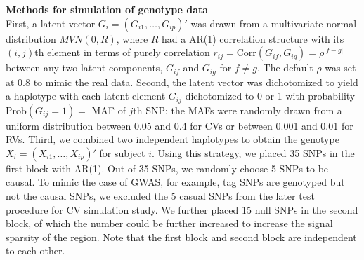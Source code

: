 \documentclass[12pt]{article}
\begin{document}

\textbf{Methods for simulation of genotype data}\\
First, a latent vector $G_i = (G_{i1}, \ldots, G_{ip})'$ was drawn from a {multivariate normal distribution} $MVN(0,R)$, where $R$ had a AR(1) correlation structure with its $(i,j)$th element in terms of purely correlation $r_{ij} =\textrm{Corr} (G_{if}, G_{ig}) = \rho ^ { |f - g| }$ between any two latent components, $G_{if}$ and $G_{ig}$ for $f \neq g$. The default $\rho$ was set at  $0.8$ to mimic the real data. Second, the latent vector was dichotomized to yield a haplotype with each latent element $G_{ij}$ dichotomized to 0 or 1 with probability $\textrm{Prob} (G_{ij} = 1) = $ MAF of $j$th SNP; the MAFs were randomly drawn from a uniform distribution between 0.05 and 0.4 for CVs or between 0.001 and 0.01 for RVs. Third, we combined two independent haplotypes to obtain the genotype $X_i = (X_{i1}, \ldots, X_{ip})' $ for subject $i$. 
Using this strategy, we placed 35 SNPs in the first block with AR(1). Out of 35 SNPs, we randomly choose 5 SNPs to be causal. To mimic the case of GWAS, for example, tag SNPs are genotyped but not the causal SNPs, we excluded the 5 casual SNPs from the later test procedure for CV simulation study. We further placed 15 null SNPs in the second block, of which the number could be further increased to increase the signal sparsity of the region. Note that the first block and second block are independent to each other. 
\end{document}
